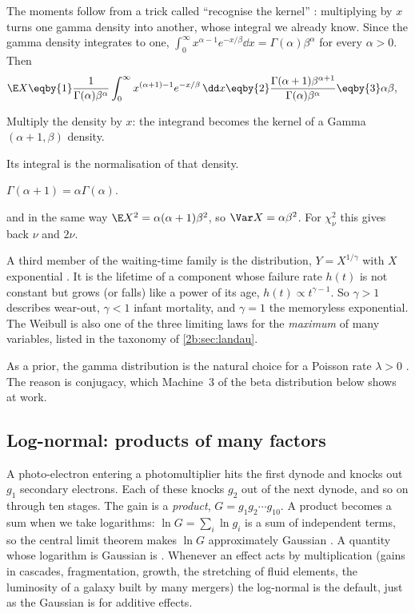 The moments follow from a trick called ``recognise the kernel'' : multiplying by $x$ turns one gamma density into another, whose integral we already know. Since the gamma density integrates to one, $\int_0^\infty x^{\alpha-1}e^{-x/\beta}\dd x=\Gamma(\alpha)\beta^\alpha$ for every $\alpha>0$. Then
\begin{align}
  \E X
  &\eqby{1}\frac{1}{\Gamma(\alpha)\beta^\alpha}\int_0^\infty x^{(\alpha+1)-1}e^{-x/\beta}\,\dd x
   \eqby{2}\frac{\Gamma(\alpha+1)\beta^{\alpha+1}}{\Gamma(\alpha)\beta^\alpha}
   \eqby{3}\alpha\beta ,
  \label{2b:eq:gamma-mean}
\end{align}
\begin{explain}
  \item Multiply the density by $x$: the integrand becomes the kernel of a Gamma$(\alpha+1,\beta)$ density.
  \item Its integral is the normalisation of that density.
  \item $\Gamma(\alpha+1)=\alpha\Gamma(\alpha)$.
\end{explain}
and in the same way $\E X^2=\alpha(\alpha+1)\beta^2$, so $\Var X=\alpha\beta^2$. For $\chi^2_\nu$ this gives back $\nu$ and $2\nu$.

A third member of the waiting-time family is the  distribution, $Y=X^{1/\gamma}$ with $X$ exponential . It is the lifetime of a component whose failure rate $h(t)$ is not constant but grows (or falls) like a power of its age, $h(t)\propto t^{\gamma-1}$. So $\gamma>1$ describes wear-out, $\gamma<1$ infant mortality, and $\gamma=1$ the memoryless exponential. The Weibull is also one of the three limiting laws for the \emph{maximum} of many variables, listed in the taxonomy of \cref{2b:sec:landau}.

As a prior, the gamma distribution is the natural choice for a Poisson rate $\lambda>0$ . The reason is conjugacy, which Machine~3 of the beta distribution below shows at work.

\subsection{Log-normal: products of many factors}
\label{2b:sec:lognormal}

A photo-electron entering a photomultiplier hits the first dynode and knocks out $g_1$ secondary electrons. Each of these knocks $g_2$ out of the next dynode, and so on through ten stages. The gain is a \emph{product}, $G=g_1g_2\cdots g_{10}$. A product becomes a sum when we take logarithms: $\ln G=\sum_i\ln g_i$ is a sum of independent terms, so the central limit theorem makes $\ln G$ approximately Gaussian . A quantity whose logarithm is Gaussian is . Whenever an effect acts by multiplication (gains in cascades, fragmentation, growth, the stretching of fluid elements, the luminosity of a galaxy built by many mergers) the log-normal is the default, just as the Gaussian is for additive effects.

